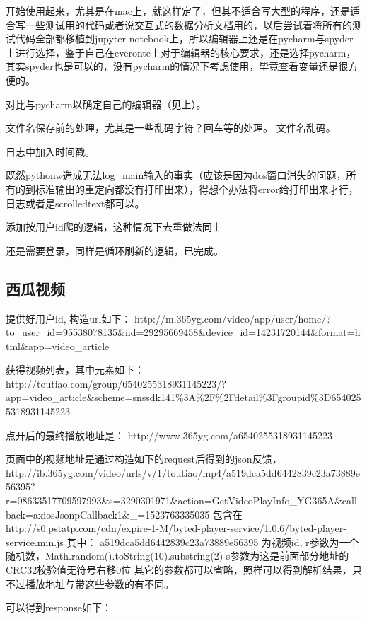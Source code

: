 \documentclass[11pt]{article}
\begin{document}
开始使用起来，尤其是在mac上，就这样定了，但其不适合写大型的程序，还是适合写一些测试用的代码或者说交互式的数据分析文档用的，以后尝试着将所有的测试代码全部都移植到jupyter
notebook上，所以编辑器上还是在pycharm与spyder上进行选择，鉴于自己在everonte上对于编辑器的核心要求，还是选择pycharm，其实spyder也是可以的，没有pycharm的情况下考虑使用，毕竟查看变量还是很方便的。

对比与pycharm以确定自己的编辑器（见上）。

文件名保存前的处理，尤其是一些乱码字符？回车等的处理。 文件名乱码。

日志中加入时间戳。

既然pythonw造成无法log\_main输入的事实（应该是因为dos窗口消失的问题，所有的到标准输出的重定向都没有打印出来），得想个办法将error给打印出来才行，日志或者是scrolledtext都可以。

添加按用户id爬的逻辑，这种情况下去重做法同上

还是需要登录，同样是循环刷新的逻辑，已完成。

    \subsection{西瓜视频}\label{ux897fux74dcux89c6ux9891}

    提供好用户id, 构造url如下：
http://m.365yg.com/video/app/user/home/?to\_user\_id=95538078135\&iid=29295669458\&device\_id=14231720144\&format=html\&app=video\_article

获得视频列表，其中元素如下：
http://toutiao.com/group/6540255318931145223/?app=video\_article\&scheme=snssdk141\%3A\%2F\%2Fdetail\%3Fgroupid\%3D6540255318931145223

点开后的最终播放地址是： http://www.365yg.com/a6540255318931145223

页面中的视频地址是通过构造如下的request后得到的json反馈，
http://ib.365yg.com/video/urls/v/1/toutiao/mp4/a519dca5dd6442839c23a73889e56395?r=08633517709597993\&s=3290301971\&action=GetVideoPlayInfo\_YG365A\&callback=axiosJsonpCallback1\&\_=1523763335035
包含在http://s0.pstatp.com/cdn/expire-1-M/byted-player-service/1.0.6/byted-player-service.min.js
其中： a519dca5dd6442839c23a73889e56395 为视频id,
r参数为一个随机数，Math.random().toString(10).substring(2)
s参数为这是前面部分地址的CRC32校验值无符号右移0位
其它的参数都可以省略，照样可以得到解析结果，只不过播放地址与带这些参数的有不同。

可以得到response如下：
\end{document}
